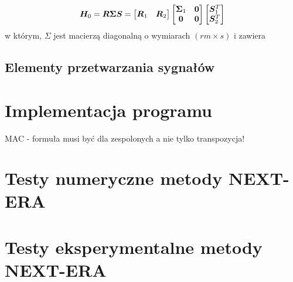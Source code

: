 \begin{equation}
	\vect{H}_0 = \vect{R}\vect{\Sigma} \vect{S} = \begin{bmatrix}
		\vect{R}_1 & \vect{R}_2
	\end{bmatrix}\begin{bmatrix}
	\vect{\Sigma}_1 & \vect{0} \\
\vect{0} & \vect{0} 
\end{bmatrix}\begin{bmatrix}
\vect{S}_1^T \\
\vect{S}_2^T 
\end{bmatrix}

\end{equation}
w którym, $\Sigma$ jest macierzą diagonalną o wymiarach $(rm\times s)$ i zawiera 

\subsection{Elementy przetwarzania sygnałów}


\section{Implementacja programu}
MAC - \parencite{allemang_modal_2003} formuła musi być dla zespolonych a nie tylko transpozycja!
\section{Testy numeryczne metody NEXT-ERA}
\section{Testy eksperymentalne metody NEXT-ERA}
